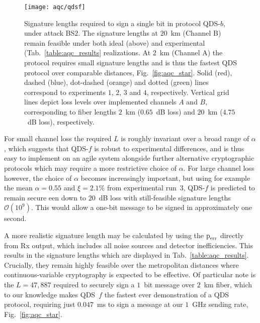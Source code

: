 \begin{figure}[htp]
\centering
\texttt{[image: aqc/qdsf]}
\caption{\label{fig:aqc_qdsf} Signature lengths required to sign a single bit in protocol QDS-$b$, under attack BS$2$. The signature lengths at $20$~km (Channel B) remain feasible under both ideal (above) and experimental (Tab.~\ref{table:aqc_results} realizations. At $2$~km (Channel A) the protocol requires small signature lengths and is thus the fastest QDS protocol over comparable distances, Fig.~\ref{fig:aqc_star}. Solid (red), dashed (blue), dot-dashed (orange) and dotted (green) lines correspond to experiments $1$, $2$, $3$ and $4$, respectively. Vertical grid lines depict loss levels over implemented channels $A$ and $B$, corresponding to fiber lengths $2$~km ($0.65$~dB loss) and $20$~km ($4.75$~dB loss), respectively.}
\end{figure}

For small channel loss the required $L$ is roughly invariant over a broad range of $\alpha$, which suggests that QDS-$f$ is robust to experimental differences, and is thus easy to implement on an agile system alongside further alternative cryptographic protocols which may require a more restrictive choice of $\alpha$. For large channel loss however, the choice of $\alpha$ becomes increasingly important, but using for example the mean $\alpha = 0.55$ and $\xi = 2.1\%$ from experimental run~$3$, QDS-$f$ is predicted to remain secure een down to $20$~dB loss with still-feasible signature lengths $\mathcal{O}\left(10^9\right)$. This would allow a one-bit message to be signed in approximately one second.

A more realistic signature length may be calculated by using the $\text{p}_{\text{err}}$ directly from Rx output, which includes all noise sources and detector inefficiencies. This results in the signature lengths which are displayed in Tab.~\ref{table:aqc_results}. Crucially, they remain highly feasible over the metropolitan distances where continuous-variable cryptography is expected to be effective. Of particular note is the $L = 47,887$ required to securely sign a $1$~bit message over $2$~km fiber, which to our knowledge makes QDS~$f$ the fastest ever demonstration of a QDS protocol, requiring just $0.047$~ms to sign a message at our $1$~GHz sending rate, Fig.~\ref{fig:aqc_star}.

